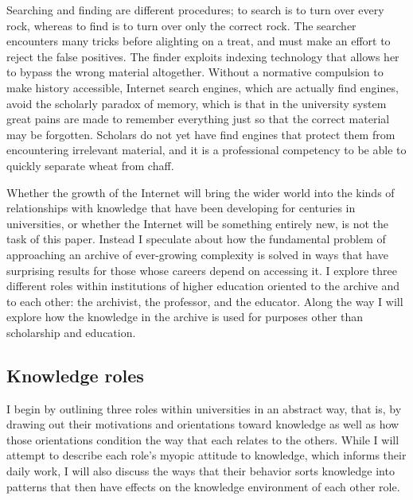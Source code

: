 \documentclass[]{book}
\theoremstyle{definition}
\theoremstyle{definition}
\theoremstyle{definition}
\theoremstyle{remark}
\begin{document}
Searching and finding are different procedures; to search is to turn
over every rock, whereas to find is to turn over only the correct rock.
The searcher encounters many tricks before alighting on a treat, and
must make an effort to reject the false positives. The finder exploits
indexing technology that allows her to bypass the wrong material
altogether. Without a normative compulsion to make history accessible,
Internet search engines, which are actually find engines, avoid the
scholarly paradox of memory, which is that in the university system
great pains are made to remember everything just so that the correct
material may be forgotten. Scholars do not yet have find engines that
protect them from encountering irrelevant material, and it is a
professional competency to be able to quickly separate wheat from chaff.

Whether the growth of the Internet will bring the wider world into the
kinds of relationships with knowledge that have been developing for
centuries in universities, or whether the Internet will be something
entirely new, is not the task of this paper. Instead I speculate about
how the fundamental problem of approaching an archive of ever-growing
complexity is solved in ways that have surprising results for those
whose careers depend on accessing it. I explore three different roles
within institutions of higher education oriented to the archive and to
each other: the archivist, the professor, and the educator. Along the
way I will explore how the knowledge in the archive is used for purposes
other than scholarship and education.

\hypertarget{knowledge-roles}{%
\subsection{Knowledge roles}\label{knowledge-roles}}

I begin by outlining three roles within universities in an abstract way,
that is, by drawing out their motivations and orientations toward
knowledge as well as how those orientations condition the way that each
relates to the others. While I will attempt to describe each role's
myopic attitude to knowledge, which informs their daily work, I will
also discuss the ways that their behavior sorts knowledge into patterns
that then have effects on the knowledge environment of each other role.
\end{document}
